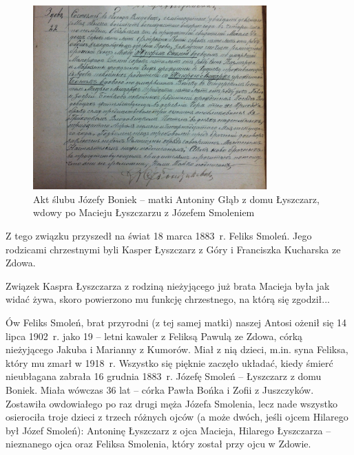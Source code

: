 \begin{figure}[!h]
\begin{center}
\includegraphics[width=0.8\textwidth]{zdjecia/akt_slubu_jozefy_boniek_i_jozefa_smolenia.jpg}
\caption[Akt ślubu Józefy Boniek z Józefem Smoleniem]{Akt ślubu Józefy Boniek -- matki Antoniny Głąb z domu Łyszczarz, wdowy po Macieju Łyszczarzu z Józefem Smoleniem}
\label{rys:akt_slubu_jozefy_boniek_i_jozefa_smolenia}
\end{center}
\end{figure}

Z tego związku przyszedł na świat 18 marca 1883~r. Feliks Smoleń. Jego rodzicami chrzestnymi byli Kasper Łyszczarz z Góry i Franciszka Kucharska ze Zdowa.

Związek Kaspra Łyszczarza z rodziną nieżyjącego już brata Macieja była jak widać żywa, skoro powierzono mu funkcję chrzestnego, na którą się zgodził...

Ów Feliks Smoleń, brat przyrodni (z tej samej matki) naszej Antosi ożenił się 14 lipca 1902~r. jako 19 – letni kawaler z Feliksą Pawulą ze Zdowa, córką nieżyjącego Jakuba i Marianny z Kumorów. Miał z nią dzieci, m.in. syna Feliksa, który mu zmarł w 1918~r.
Wszystko się pięknie zaczęło układać, kiedy śmierć nieubłagana zabrała 16 grudnia 1883~r. Józefę Smoleń -- Łyszczarz z domu Boniek. Miała wówczas 36 lat -- córka Pawła Bońka i Zofii z Juszczyków. Zostawiła owdowiałego po raz drugi męża Józefa Smolenia, lecz nade wszystko osierociła troje dzieci z  trzech różnych ojców (a może dwóch, jeśli ojcem Hilarego był Józef Smoleń): Antoninę Łyszczarz z ojca Macieja, Hilarego Łyszczarza – nieznanego ojca oraz Feliksa Smolenia, który został przy ojcu w Zdowie.

